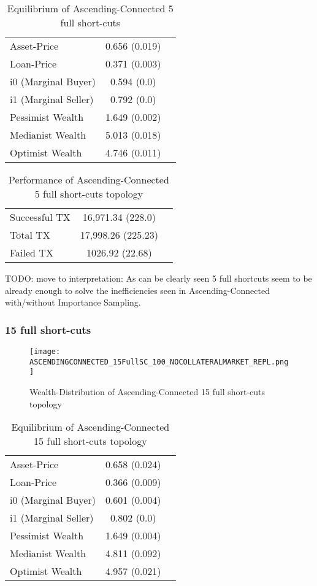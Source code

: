 \documentclass[Bachelorarbeit.tex]{subfiles}
\begin{document}
\begin{table}[h]
	\caption{Equilibrium of Ascending-Connected 5 full short-cuts}
	\centering
	\begin{tabular} { l c r }
		\hline
		Asset-Price & 0.656 (0.019) \\
		Loan-Price & 0.371 (0.003) \\
		i0 (Marginal Buyer) & 0.594 (0.0) \\
		i1 (Marginal Seller) & 0.792 (0.0) \\
		Pessimist Wealth & 1.649 (0.002) \\
		Medianist Wealth & 5.013 (0.018) \\
		Optimist Wealth & 4.746 (0.011) \\
		\hline
	\end{tabular}
\end{table} 

\begin{table}[h]
	\caption{Performance of Ascending-Connected 5 full short-cuts topology}
	\centering
	\begin{tabular} { l c r }
		\hline
		Successful TX & 16,971.34 (228.0) \\
		Total TX & 17,998.26 (225.23) \\
		Failed TX & 1026.92 (22.68) \\
		\hline
	\end{tabular}
\end{table}

TODO: move to interpretation: As can be clearly seen 5 full shortcuts seem to be already enough to solve the inefficiencies seen in Ascending-Connected with/without Importance Sampling.

\subsubsection{15 full short-cuts}
\begin{figure}[H]
	\centering
  \texttt{[image: ASCENDINGCONNECTED\_15FullSC\_100\_NOCOLLATERALMARKET\_REPL.png]}
	\caption{Wealth-Distribution of Ascending-Connected 15 full short-cuts topology}
	\label{fig1}
\end{figure}

\begin{table}[h]
	\caption{Equilibrium of Ascending-Connected 15 full short-cuts topology}
	\centering
	\begin{tabular} { l c r }
		\hline
		Asset-Price & 0.658 (0.024) \\
		Loan-Price & 0.366 (0.009) \\
		i0 (Marginal Buyer) & 0.601 (0.004) \\
		i1 (Marginal Seller) & 0.802 (0.0) \\
		Pessimist Wealth & 1.649 (0.004) \\
		Medianist Wealth & 4.811 (0.092) \\
		Optimist Wealth & 4.957 (0.021) \\
		\hline
	\end{tabular}
\end{table} 
\end{document}
